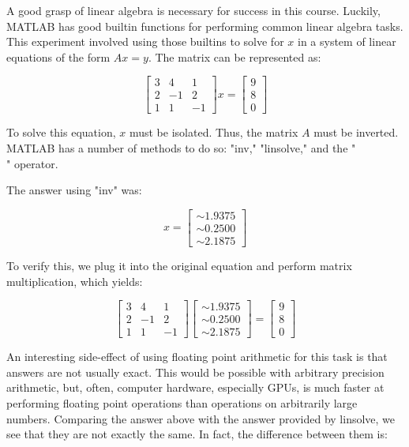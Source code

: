 \documentclass{article}
\begin{document}
A good grasp of linear algebra is necessary for success in this course. Luckily, 
MATLAB has good builtin functions for performing common linear algebra tasks. 
This experiment involved using those builtins to solve for $x$ in a system of 
linear equations of the form $Ax = y$. The matrix can be represented as:

$$
\begin{bmatrix}
3 &  4 &  1 \\
2 & -1 &  2 \\
1 &  1 & -1
\end{bmatrix} x = \begin{bmatrix}
9 \\
8 \\
0
\end{bmatrix}
$$

To solve this equation, $x$ must be isolated. Thus, the matrix $A$ must be 
inverted. MATLAB has a number of methods to do so: "inv," "linsolve," and the 
"\\" operator.

The answer using "inv" was:

$$
x = \begin{bmatrix}
\sim 1.9375 \\
\sim 0.2500 \\
\sim 2.1875
\end{bmatrix}
$$

To verify this, we plug it into the original equation and perform matrix 
multiplication, which yields:

$$
\begin{bmatrix}
3 &  4 &  1 \\
2 & -1 &  2 \\
1 &  1 & -1
\end{bmatrix} \begin{bmatrix}
\sim 1.9375 \\
\sim 0.2500 \\
\sim 2.1875
\end{bmatrix} = \begin{bmatrix}
9 \\
8 \\
0
\end{bmatrix}
$$

An interesting side-effect of using floating point arithmetic for this task is 
that answers are not usually exact. This would be possible with arbitrary 
precision arithmetic, but, often, computer hardware, especially GPUs, is much 
faster at 
performing floating point operations than operations on arbitrarily large 
numbers. Comparing the answer above with the answer provided by linsolve, we 
see that they are not exactly the same. In fact, the difference between them is: 
\end{document}
